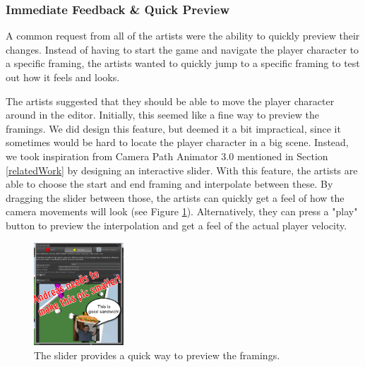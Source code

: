 
\subsubsection{Immediate Feedback \& Quick Preview}
A common request from all of the artists were the ability to quickly preview their changes. Instead of having to start the game and navigate the player character to a specific framing, the artists wanted to quickly jump to a specific framing to test out how it feels and looks.

The artists suggested that they should be able to move the player character around in the editor. Initially, this seemed like a fine way to preview the framings. We did design this feature, but deemed it a bit impractical, since it sometimes would be hard to locate the player character in a big scene. Instead, we took inspiration from Camera Path Animator 3.0 mentioned in Section \ref{relatedWork} by designing an interactive slider. With this feature, the artists are able to choose the start and end framing and interpolate between these. By dragging the slider between those, the artists can quickly get a feel of how the camera movements will look (see Figure \ref{fig:slider}). Alternatively, they can press a "play" button to preview the interpolation and get a feel of the actual player velocity.

\begin{figure}[htbp]
\centering
\includegraphics[width=0.3\textwidth]{Pics/slider}
\caption{The slider provides a quick way to preview the framings.}
\label{fig:slider}
\end{figure}

